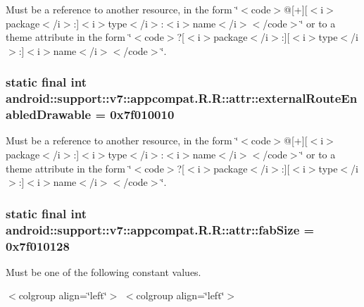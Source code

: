 Must be a reference to another resource, in the form \char`\"{}$<$code$>$@\mbox{[}+\mbox{]}\mbox{[}$<$i$>$package$<$/i$>$:\mbox{]}$<$i$>$type$<$/i$>$:$<$i$>$name$<$/i$>$$<$/code$>$\char`\"{} or to a theme attribute in the form \char`\"{}$<$code$>$?\mbox{[}$<$i$>$package$<$/i$>$:\mbox{]}\mbox{[}$<$i$>$type$<$/i$>$:\mbox{]}$<$i$>$name$<$/i$>$$<$/code$>$\char`\"{}. \hypertarget{classandroid_1_1support_1_1v7_1_1appcompat_1_1_r_1_1attr_59eaff27ec0aac94fec6b75a21249a01}{
\subsubsection[{externalRouteEnabledDrawable}]{\setlength{\rightskip}{0pt plus 5cm}static final int android::support::v7::appcompat.R.R::attr::externalRouteEnabledDrawable = 0x7f010010}}
\label{classandroid_1_1support_1_1v7_1_1appcompat_1_1_r_1_1attr_59eaff27ec0aac94fec6b75a21249a01}


Must be a reference to another resource, in the form \char`\"{}$<$code$>$@\mbox{[}+\mbox{]}\mbox{[}$<$i$>$package$<$/i$>$:\mbox{]}$<$i$>$type$<$/i$>$:$<$i$>$name$<$/i$>$$<$/code$>$\char`\"{} or to a theme attribute in the form \char`\"{}$<$code$>$?\mbox{[}$<$i$>$package$<$/i$>$:\mbox{]}\mbox{[}$<$i$>$type$<$/i$>$:\mbox{]}$<$i$>$name$<$/i$>$$<$/code$>$\char`\"{}. \hypertarget{classandroid_1_1support_1_1v7_1_1appcompat_1_1_r_1_1attr_d10f28134228706c7f5aea6fce361a8a}{
\subsubsection[{fabSize}]{\setlength{\rightskip}{0pt plus 5cm}static final int android::support::v7::appcompat.R.R::attr::fabSize = 0x7f010128}}
\label{classandroid_1_1support_1_1v7_1_1appcompat_1_1_r_1_1attr_d10f28134228706c7f5aea6fce361a8a}


Must be one of the following constant values. \begin{TabularC}{0}
\hline
\end{TabularC}
$<$colgroup align=\char`\"{}left\char`\"{}$>$ $<$colgroup align=\char`\"{}left\char`\"{}$>$ 

